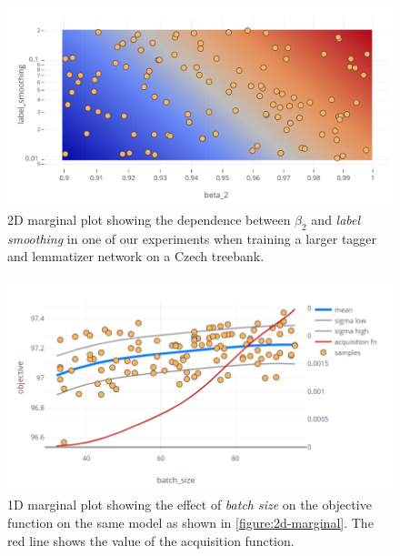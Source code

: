 \begin{figure}
	\begin{center}
		\includegraphics[width=1.0\textwidth]{images/2d-marginal.png}
		\caption{2D marginal plot showing the dependence between $\beta_2$ and \emph{label smoothing} in one of our experiments when training a larger tagger and lemmatizer network on a Czech treebank.}
		\label{figure:2d-marginal}
	\end{center}
\end{figure}

\begin{figure}
	\begin{center}
		\includegraphics[width=1.0\textwidth]{images/1d-marginal.png}
		\caption{1D marginal plot showing the effect of \emph{batch size} on the objective function on the same model as shown in \autoref{figure:2d-marginal}. The red line shows the value of the acquisition function.}
		\label{figure:1d-marginal}
	\end{center}
\end{figure}

